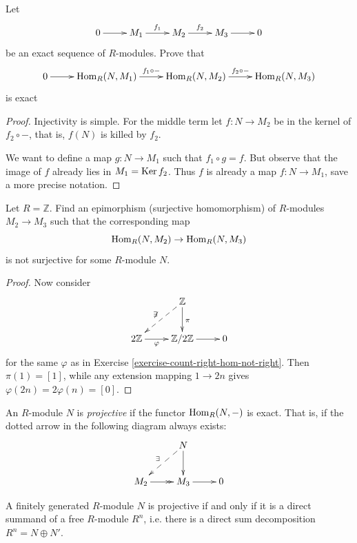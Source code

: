\begin{exercise}
\label{exercise-left-hom-is-left-exact}
Let
$$
\xymatrix{
0\ar[r]
&M_1\ar[r]^{f_1}
&M_2\ar[r]^{f_2}
&M_3\ar[r]
&0
}
$$
be an exact sequence of $R$-modules.
Prove that
$$
\xymatrix{
0\ar[r]
&\Hom_R(N,M_1)\ar[r]^{f_1 \circ -}
&\Hom_R(N,M_2)\ar[r]^{f_2 \circ -}
&\Hom_R(N,M_3)
}
$$
is exact
\end{exercise}

\begin{proof}
Injectivity is simple.
For the middle term let $f:N \to M_2$ be in
the kernel
of $f_2 \circ -$,
that is, $f(N)$ is killed by $f_2$.

We want to define a map $g:N \to M_1$
such that $f_1 \circ g = f$.
But observe that the image of $f$ already
lies in $M_1 = \mathop{\mathrm{Ker}} f_2$.
Thus $f$ is already a map $f:N \to M_1$,
save a more precise notation.
\end{proof}

\begin{exercise}
\label{exercise-count-left-hom-not-right}
Let $R=\mathbb{Z}$. Find an epimorphism
(surjective homomorphism)
of $R$-modules $M_2 \to M_3$ such that the
corresponding map
$$
\mathop{\mathrm{Hom}}\nolimits_R(N,M_2) \to \mathop{\mathrm{Hom}}\nolimits_R(N,M_3)
$$
is not surjective for some $R$-module $N$.
\end{exercise}

\begin{proof}
Now consider
$$
\xymatrix{
&\mathbb{Z}
\ar[d]^\pi\ar@{-->}[dl]_{\not\exists}\\
2\mathbb{Z}\ar[r]_-\varphi&
\mathbb{Z}/2\mathbb{Z}\ar[r]& 0
}
$$
for the same $\varphi$ as in Exercise
\ref{exercise-count-right-hom-not-right}.
Then $\pi(1)=[1]$, while any extension
mapping $1 \to 2n$
gives $\varphi(2n)=2\varphi(n)=[0]$.
\end{proof}

\begin{definition}
\label{definition-projective-module}
An $R$-module $N$ is {\it projective} if
the functor $\mathop{\mathrm{Hom}}\nolimits_R(N,-)$ is exact.
That is, if the dotted
arrow in the following diagram always exists:
$$
\xymatrix{
&N \ar[d]\ar@{-->}[dl]_{\exists}\\
M_2\ar@{->>}[r]&M_3\ar[r]& 0
}
$$

\end{definition}

\begin{exercise}
\label{exercise-finit-gener-proje-iff-fact}
A finitely generated $R$-module $N$ is
projective
if and only if
it is a direct summand of a free $R$-module
$R^n$,
i.e. there is a direct sum decomposition
$R^n=N \oplus N'$.
\end{exercise}

